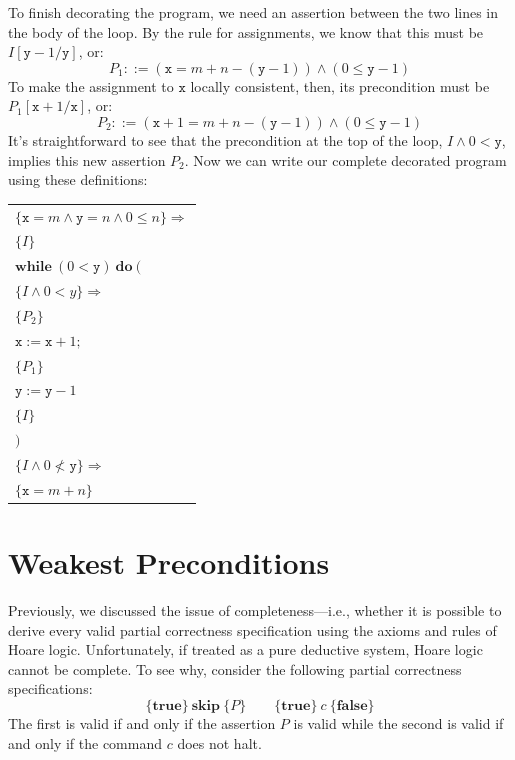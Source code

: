 To finish decorating the program, we need an assertion between the two lines in the body of the
loop. By the rule for assignments, we know that this must be $I[\mathtt{y} - 1/\mathtt{y}]$, or:
\[
P_1 ::= (\mathtt{x} = m + n - (\mathtt{y} - 1)) \wedge (0 \leq \mathtt{y} - 1)
\]
To make the assignment to $\mathtt{x}$ locally consistent, then, its precondition must be
$P_1[\mathtt{x} + 1/\mathtt{x}]$, or:
\[
P_2 ::= (\mathtt{x} + 1 = m + n - (\mathtt{y} - 1)) \wedge (0 \leq \mathtt{y} - 1)
\]
It's straightforward to see that the precondition at the top of the loop, $I \wedge 0 <
\mathtt{y}$, implies this new assertion $P_2$. Now we can write our complete decorated program
using these definitions:

\begin{center}
\begin{tabular}{l}
$\{\mathtt{x} = m \wedge \mathtt{y} = n \wedge 0 \leq n\} \Rightarrow$ \\
$\{I\}$ \\
$\mathbf{while}\ (0 < \mathtt{y})\ \mathbf{do}\ ($ \\
\qquad $\{I \wedge 0 < y\} \Rightarrow$ \\
\qquad $\{P_2\}$ \\
\qquad $\mathtt{x} := \mathtt{x} + 1;$ \\
\qquad $\{P_1\}$ \\
\qquad $\mathtt{y} := \mathtt{y} - 1$ \\
\qquad $\{I\}$ \\
$)$ \\
$\{I \wedge 0 \not< \mathtt{y}\} \Rightarrow$ \\
$\{\mathtt{x} = m + n\}$
\end{tabular}
\end{center}

\section{Weakest Preconditions}

Previously, we discussed the issue of completeness---i.e., whether it is possible to derive
every valid partial correctness specification using the axioms and rules of Hoare logic.
Unfortunately, if treated as a pure deductive system, Hoare logic cannot be complete. To see
why, consider the following partial correctness specifications:
\[
\{\mathbf{true}\}\ \mathbf{skip}\ \{P\}
\qquad
\{\mathbf{true}\}\ c\ \{\mathbf{false}\}
\]
The first is valid if and only if the assertion $P$ is valid while the second is valid if and
only if the command $c$ does not halt.

